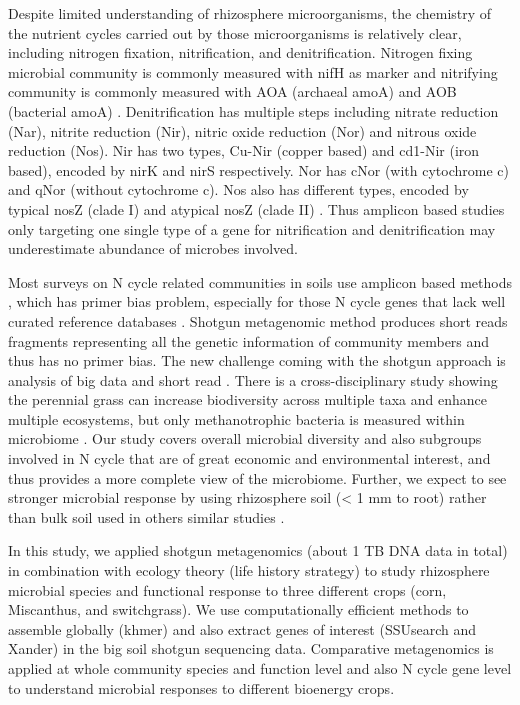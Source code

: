 \documentclass[]{msu-thesis}
\begin{document}
Despite limited understanding of rhizosphere microorganisms, the chemistry of the nutrient cycles carried out by those microorganisms is relatively clear, including nitrogen fixation, nitrification, and denitrification. Nitrogen fixing microbial community is commonly measured with nifH as marker and nitrifying community is commonly measured with AOA (archaeal amoA) and AOB (bacterial amoA) \cite{gaby_comprehensive_2012,prosser_archaeal_2012}. Denitrification has multiple steps including nitrate reduction (Nar), nitrite reduction (Nir), nitric oxide reduction (Nor) and nitrous oxide reduction (Nos). Nir has two types, Cu-Nir (copper based) and cd1-Nir (iron based), encoded by nirK and nirS respectively. Nor has cNor (with cytochrome c) and qNor (without cytochrome c). Nos also has different types, encoded by typical nosZ (clade I) and atypical nosZ (clade II) \cite{zumft_cell_1997}. Thus amplicon based studies only targeting one single type of a gene for nitrification and denitrification may underestimate abundance of microbes involved.

Most surveys on N cycle related communities in soils use amplicon based methods \cite{mao_impact_2013,hai_quantification_2009,kandeler_abundance_2006}, which has primer bias problem, especially for those N cycle genes that lack well curated reference databases \cite{gaby_comprehensive_2012,sanford_unexpected_2012,heylen_incidence_2006}. Shotgun metagenomic method produces short reads fragments representing all the genetic information of community members and thus has no primer bias. The new challenge coming with the shotgun approach is analysis of big data and short read \cite{qin_human_2010,pell_scaling_2012}. There is a cross-disciplinary study showing the perennial grass can increase biodiversity across multiple taxa and enhance multiple ecosystems, but only methanotrophic bacteria is measured within microbiome \cite{werling_perennial_2014}. Our study covers overall microbial diversity and also subgroups involved in N cycle that are of great economic and environmental interest, and thus provides a more complete view of the microbiome. Further, we expect to see stronger microbial response by using rhizosphere soil (< 1 mm to root) rather than bulk soil used in others similar studies \cite{mao_impact_2013,werling_perennial_2014}.

In this study, we applied shotgun metagenomics (about 1 TB DNA data in total) in combination with ecology theory (life history strategy) to study rhizosphere microbial species and functional response to three different crops (corn, Miscanthus, and switchgrass). We use computationally efficient methods to assemble globally (khmer) \cite{pell_scaling_2012,zhang_these_2014,crusoe_khmer_2015} and also extract genes of interest (SSUsearch and Xander) \cite{guo_microbial_2015,wang_xander:_2015} in the big soil shotgun sequencing data. Comparative metagenomics is applied at whole community species and function level and also N cycle gene level to understand microbial responses to different bioenergy crops. 
\end{document}
